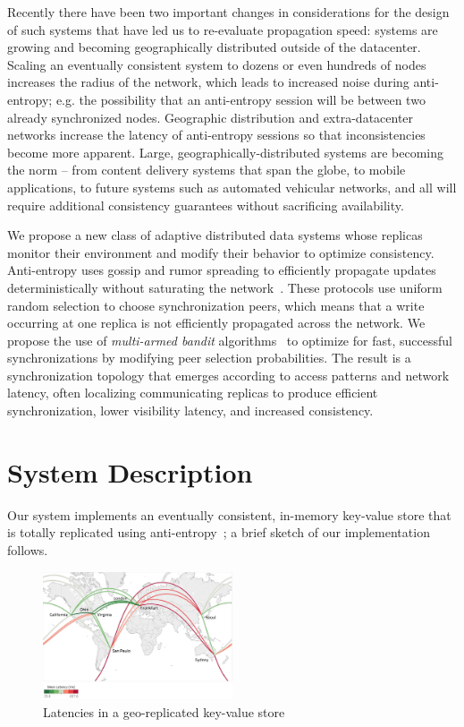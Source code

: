 Recently there have been two important changes in considerations for the
design of such systems that have led us to re-evaluate propagation speed:
systems are growing and becoming geographically distributed
outside of the datacenter.
Scaling an eventually consistent system to dozens or even hundreds of nodes
increases the radius of the network, which leads to increased noise during
anti-entropy; e.g. the possibility that an anti-entropy session will be
between two already synchronized nodes.
Geographic distribution and extra-datacenter networks increase the latency of
anti-entropy sessions so that inconsistencies become more apparent.
Large, geographically-distributed systems are becoming the norm -- from
content delivery systems that span the globe, to mobile applications, to
future systems such as automated vehicular networks, and all will require
additional consistency guarantees without sacrificing availability.

We propose a new class of adaptive distributed data systems whose replicas monitor their
environment and modify their behavior to optimize consistency.
Anti-entropy uses gossip and rumor spreading to efficiently propagate updates
deterministically without saturating the
network~\cite{haeupler_simple_2015,karp_randomized_2000,moreno_dynamics_2004}.
These protocols use uniform random selection to choose synchronization peers, which means
that a write occurring at one replica is not efficiently propagated across the network.
We propose the use of \textit{multi-armed bandit}
algorithms~\cite{langford_epoch-greedy_2008,luo_efficient_2017} to optimize for fast,
successful synchronizations by modifying peer selection probabilities.
The result is a synchronization topology that emerges according to access patterns and network
latency, often localizing communicating replicas to produce efficient synchronization,
lower visibility latency, and increased consistency.

\section*{System Description}

Our system implements an eventually consistent, in-memory key-value store
that is totally replicated using anti-entropy~\cite{decandia_dynamo:_2007};
a brief sketch of our implementation follows.

\begin{figure}[h]
    \centering
    \includegraphics[width=0.5\textwidth]{figures/network}
    \caption{Latencies in a geo-replicated key-value store}
    \label{fig:network}
\end{figure}

